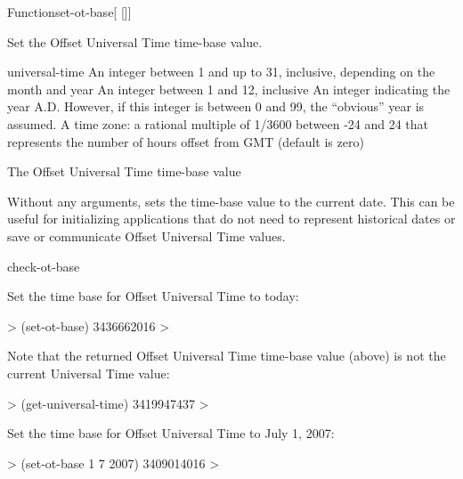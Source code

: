 \documentclass[10pt,twoside,english,pdftex]{article}
\begin{document}
\begin{functiondoc}{Function}{set-ot-base}{[
   []]
  \returns{} }
%

\fnsyntax

\fnpurpose Set the Offset Universal Time time-base value.

\fnpackage {}

\fnmodule {}

\fnargs
\begin{args}{universal-time}
  \arg[date] An integer between 1 and up to 31, inclusive, depending
  on the month and year
  \arg[month] An integer between 1 and 12, inclusive
  \arg[year] An integer indicating the year A.D. However, if this
  integer is between 0 and 99, the ``obvious'' year is assumed.
   A time zone: a rational multiple of 1/3600 between
  -24 and 24 that represents the number of hours offset from GMT 
  (default is zero)
\end{args}

\fnreturns The Offset Universal Time time-base value

\fndescription Without any arguments,  sets the
time-base value to the current date.  This can be useful for initializing
applications that do not need to represent historical dates or save or
communicate Offset Universal Time values.

\begin{alsos}{check-ot-base}
\also[*ot-base*]
\also[ot2ut]
\also[ut2ot]
\end{alsos}

\fnexamples
Set the time base for Offset Universal Time to today:
%
\W\supp
\begin{example}
  > (set-ot-base)
  3436662016
  >
\end{example}
Note that the returned Offset Universal Time time-base value (above) is not
the current Universal Time value:
%
\W\supp\notpretop
\begin{example}
  > (get-universal-time)
  3419947437
  >
\end{example}

Set the time base for Offset Universal Time to July 1, 2007:
%
\W\supp
\begin{example}
  > (set-ot-base 1 7 2007)
  3409014016
  >
\end{example}

\end{functiondoc}
\end{document}
